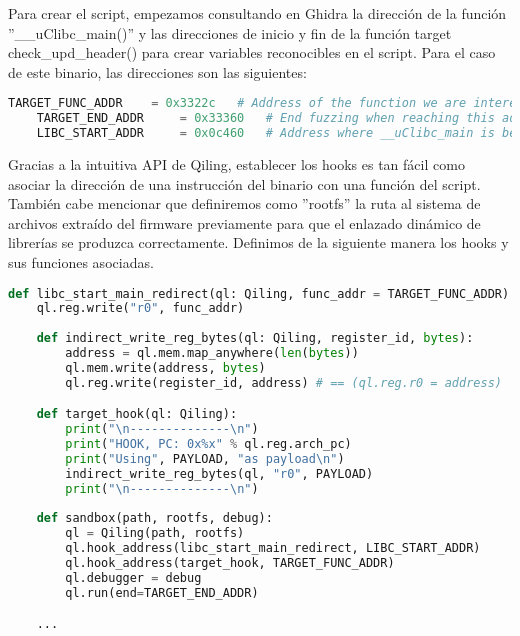 Para crear el script, empezamos consultando en Ghidra la dirección de la función ''\_\_uClibc\_main()'' y las direcciones de 
inicio y fin de la función target check\_upd\_header() para crear variables reconocibles en el script. Para el caso de este 
binario, las direcciones son las siguientes:

\begin{lstlisting}[language=python, caption=Declaración de constantes: Direcciones de interés en funciones., captionpos=b,
     frame=single, breaklines]
    TARGET_FUNC_ADDR    = 0x3322c   # Address of the function we are interested in
    TARGET_END_ADDR     = 0x33360   # End fuzzing when reaching this address
    LIBC_START_ADDR     = 0x0c460   # Address where __uClibc_main is being called
\end{lstlisting}

Gracias a la intuitiva API de Qiling, establecer los hooks es tan fácil como asociar la dirección de una instrucción del binario
con una función del script. También cabe mencionar que definiremos como ''rootfs'' la ruta al sistema de archivos extraído del
firmware previamente para que el enlazado dinámico de librerías se produzca correctamente. Definimos de la siguiente manera los
hooks y sus funciones asociadas.

\begin{lstlisting}[language=python, caption=Declaración de constantes: Direcciones de interés en funciones., captionpos=b,
    frame=single, breaklines]
    def libc_start_main_redirect(ql: Qiling, func_addr = TARGET_FUNC_ADDR):
    ql.reg.write("r0", func_addr)
    
    def indirect_write_reg_bytes(ql: Qiling, register_id, bytes):
        address = ql.mem.map_anywhere(len(bytes))
        ql.mem.write(address, bytes)
        ql.reg.write(register_id, address) # == (ql.reg.r0 = address) 

    def target_hook(ql: Qiling):    
        print("\n--------------\n")
        print("HOOK, PC: 0x%x" % ql.reg.arch_pc)
        print("Using", PAYLOAD, "as payload\n")
        indirect_write_reg_bytes(ql, "r0", PAYLOAD)
        print("\n--------------\n")
        
    def sandbox(path, rootfs, debug):    
        ql = Qiling(path, rootfs)
        ql.hook_address(libc_start_main_redirect, LIBC_START_ADDR)
        ql.hook_address(target_hook, TARGET_FUNC_ADDR)     
        ql.debugger = debug
        ql.run(end=TARGET_END_ADDR)

    ...
\end{lstlisting}

